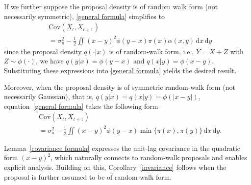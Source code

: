 \documentclass[conference]{IEEEtran}
\newcommand{\df}{\mathrm{d}}
\theoremstyle{definition}
\begin{document}
If we further suppose the proposal density is of random walk form (not necessarily symmetric), \eqref{general formula} simplifies to
\begin{align}\label{formula for rw}
        &\mathrm{Cov}(X_t,X_{t+1})\nonumber\\
        &=\sigma_{\pi}^2-\frac12\iint(x-y)^2\phi(y-x)\pi(x)\alpha(x,y)\,\df x\,\df y
\end{align}
since the proposal density \(q(\cdot|x)\) is of random-walk form, i.e., \(Y=X+Z\) with \(Z\sim\phi(\cdot)\), we have 
\(q(y|x)=\phi(y-x)\) and \(q(x|y)=\phi(x-y)\). Substituting these expressions into \eqref{general formula} yields the desired result.


Moreover, when the proposal density is of symmetric random-walk form (not necessarily Gaussian), 
that is, $q(y|x)=q(x|y)=\phi(|x-y|)$, equation~\eqref{general formula} takes the following form
\begin{align}\label{formula for srw}
&\mathrm{Cov}(X_t,X_{t+1})\nonumber\\
&= \sigma_{\pi}^2
-\tfrac{1}{2}\iint (x-y)^2 \phi(y-x)\min\{\pi(x),\pi(y)\}\,\df x\,\df y.    
\end{align}

Lemma~\ref{covariance formula} expresses the unit-lag covariance in the quadratic form $(x-y)^2$, which naturally connects to random-walk proposals and enables explicit analysis. Building on this, Corollary~\ref{invariance} follows when the proposal is further assumed to be of random-walk form.
\end{document}
